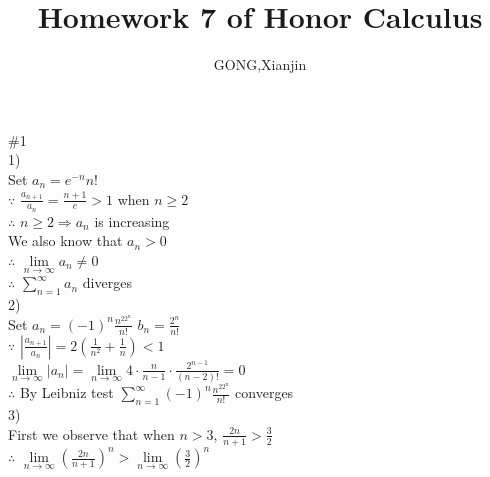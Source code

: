 \documentclass{article}
\author{GONG,Xianjin}
\title{Homework 7 of Honor Calculus}
\begin{document}
\maketitle

\vspace{3.5mm}

\textcolor[rgb]{0.00,0.00,0.50}{\#1}\\

1)\\

Set $a_n = e^{-n}n!$\\

$\because$ \qquad $\displaystyle \frac{a_{n+1}}{a_n} = \frac{n+1}{e} > 1$ when $n \geq 2$\\

$\therefore$ \qquad $\displaystyle n \geq 2 \Rightarrow a_n$ is increasing\\

We also know that $a_n > 0$\\

$\therefore$ \qquad $\displaystyle \lim \limits_{n \to \infty} a_n \neq 0$\\

$\therefore$ \qquad $\displaystyle \sum \limits_{n=1}^\infty a_n$ diverges\\

2)\\

Set $a_n = (-1)^n \frac{n^22^n}{n!}$ \qquad $b_n = \frac{2^n}{n!}$\\

$\because$ \qquad $\displaystyle \left|\frac{a_{n+1}}{a_n}\right| = 2\left(\frac{1}{n^2} + \frac{1}{n}\right) < 1$\\

\hskip 1.1cm $\displaystyle \lim \limits_{n \to \infty} |a_n| = \lim \limits_{n \to \infty} 4 \cdot \frac{n}{n-1} \cdot \frac{2^{n-1}}{(n-2)!} = 0$\\

$\therefore$ \qquad By Leibniz test \quad $\displaystyle \sum \limits_{n=1}^\infty (-1)^n \frac{n^22^n}{n!}$ \quad converges\\

3)\\

First we observe that when $n > 3$, $\frac{2n}{n+1} > \frac{3}{2}$\\

$\therefore$ \qquad $\displaystyle \lim \limits_{n \to \infty} \left(\frac{2n}{n+1}\right)^n > \lim \limits_{n \to \infty} \left(\frac{3}{2}\right)^n$\\
\end{document}
